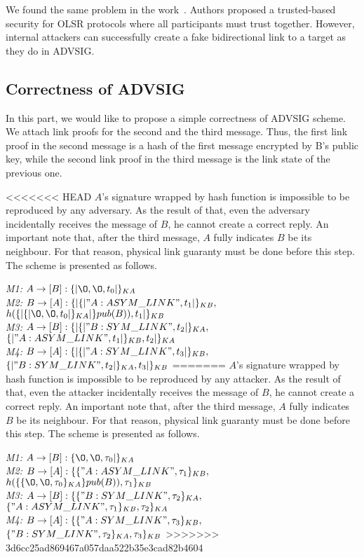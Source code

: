 \begin{flushleft}
\begin{figure}
\end{figure}

We found the same problem in the work~\cite{Adnane20131159}. Authors proposed a trusted-based security for OLSR protocols where all participants must trust together. However, internal attackers can successfully create a fake bidirectional link to a target as they do in ADVSIG. 

\subsection{Correctness of ADVSIG}
In this part, we would like to propose a simple correctness of ADVSIG scheme. We attach link proofs for the second and the third message. Thus, the first link proof in the second message is a hash of the first message encrypted by B's public key, while the second link proof in the third message is the link state of the previous one. 

<<<<<<< HEAD
$A$'s signature wrapped by hash function is impossible to be reproduced by any adversary. As the result of that, even the adversary incidentally receives the message of $B$, he cannot create a correct reply. An important note that, after the third message, $A$ fully indicates $B$ be its neighbour. For that reason, physical link guaranty must be done before this step. The scheme is presented as follows. 

\begin{flushleft}
 \emph{M1:} $A \to [B]: \{|\O, \O, t_0|\}_{KA}$\\
 \emph{M2:} $B \to [A]: \{|\{|"A:ASYM\_LINK", t_1|\}_{KB},$ $h(\{|\{|\O, \O, t_0|\}_{KA}|\}pub(B)),t_1|\}_{KB}$\\
\emph{M3:} $A \to [B]: \{|\{| "B:SYM\_LINK",t_2|\}_{KA},$ $\{|"A:ASYM\_LINK", t_1|\}_{KB},t_2 |\}_{KA}$\\
 \emph{M4:} $B \to [A] : \{|\{| "A:SYM\_LINK", t_3|\}_{KB},$ $\{| "B:SYM\_LINK",t_2|\}_{KA} ,t_3|\}_{KB}$
=======
$A$'s signature wrapped by hash function is impossible to be reproduced by any attacker. As the result of that, even the attacker incidentally receives the message of $B$, he cannot create a correct reply. An important note that, after the third message, $A$ fully indicates $B$ be its neighbour. For that reason, physical link guaranty must be done before this step. The scheme is presented as follows. 

\begin{flushleft}
 \emph{M1:} $A \to [B]: \{\O, \O, \tau_0|\}_{KA}$\\
 \emph{M2:} $B \to [A]: \{\{"A:ASYM\_LINK", \tau_1\}_{KB},$ $h(\{\{\O, \O, \tau_0\}_{KA}\}pub(B)),\tau_1\}_{KB}$\\
\emph{M3:} $A \to [B]: \{\{ "B:SYM\_LINK",\tau_2\}_{KA},$ $\{"A:ASYM\_LINK", \tau_1\}_{KB},\tau_2\}_{KA}$\\
 \emph{M4:} $B \to [A] : \{\{ "A:SYM\_LINK", \tau_3\}_{KB},$ $\{"B:SYM\_LINK",\tau_2\}_{KA} ,\tau_3\}_{KB}$
>>>>>>> 3d6cc25ad869467a057daa522b35e3cad82b4604
\end{flushleft}


\end{flushleft}
\end{flushleft}
